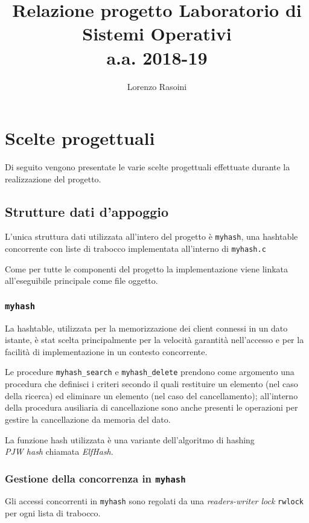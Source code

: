 \documentclass[a4paper,11pt]{article}
\begin{document}
\begin{titlepage}

\title{{Relazione progetto Laboratorio di\\Sistemi Operativi\\a.a. 2018-19}}
\author{Lorenzo Rasoini}
\date{}
\maketitle

\thispagestyle{empty}
\tableofcontents
\end{titlepage}

\newpage

\section{Scelte progettuali}
Di seguito vengono presentate le varie scelte progettuali effettuate durante la realizzazione del progetto.
\subsection{Strutture dati d'appoggio}
L'unica struttura dati utilizzata all'intero del progetto è \texttt{myhash}, una hashtable concorrente con liste di trabocco implementata all'interno
di \texttt{myhash.c}

Come per tutte le componenti del progetto la implementazione viene linkata all'eseguibile principale come file oggetto.
\subsubsection{\texttt{myhash}}
La hashtable, utilizzata per la memorizzazione dei client connessi in un dato istante, è stat scelta principalmente per la velocità
garantità nell'accesso e per la facilità di implementazione in un contesto concorrente.

Le procedure \texttt{myhash\_search} e \texttt{myhash\_delete} prendono come argomento una procedura che definisci i criteri secondo il quali restituire un elemento (nel caso della ricerca)
ed eliminare un elemento (nel caso del cancellamento); all'interno della procedura ausiliaria di cancellazione sono anche presenti le operazioni per gestire la cancellazione da memoria del dato.

La funzione hash utilizzata è una variante dell'algoritmo di hashing\\\emph{PJW hash} chiamata \emph{ElfHash}.
\subsubsection{Gestione della concorrenza in \texttt{myhash}}
Gli accessi concorrenti in \texttt{myhash} sono regolati da una \emph{readers-writer lock} \texttt{rwlock} per ogni lista di trabocco.
\end{document}

